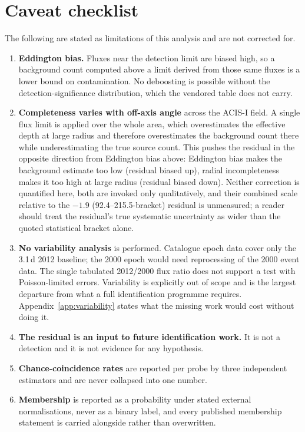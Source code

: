 \documentclass[11pt]{article}
\begin{document}
\appendix

\section{Caveat checklist}
\label{app:caveats}

The following are stated as limitations of this analysis and are not corrected for.

\begin{enumerate}
\item \textbf{Eddington bias.} Fluxes near the detection limit are biased high, so a background count computed above a limit derived from those same fluxes is a lower bound on contamination. No deboosting is possible without the detection-significance distribution, which the vendored table does not carry.
\item \textbf{Completeness varies with off-axis angle} across the ACIS-I field. A single flux limit is applied over the whole area, which overestimates the effective depth at large radius and therefore overestimates the background count there while underestimating the true source count. This pushes the residual in the opposite direction from Eddington bias above: Eddington bias makes the background estimate too low (residual biased up), radial incompleteness makes it too high at large radius (residual biased down). Neither correction is quantified here, both are invoked only qualitatively, and their combined scale relative to the $-1.9$ (92.4--215.5-bracket) residual is unmeasured; a reader should treat the residual's true systematic uncertainty as wider than the quoted statistical bracket alone.
\item \textbf{No variability analysis} is performed. Catalogue epoch data cover only the 3.1\,d 2012 baseline; the 2000 epoch would need reprocessing of the 2000 event data. The single tabulated 2012/2000 flux ratio does not support a test with Poisson-limited errors. Variability is explicitly out of scope and is the largest departure from what a full identification programme requires. Appendix~\ref{app:variability} states what the missing work would cost without doing it.
\item \textbf{The residual is an input to future identification work.} It is not a detection and it is not evidence for any hypothesis.
\item \textbf{Chance-coincidence rates} are reported per probe by three independent estimators and are never collapsed into one number.
\item \textbf{Membership} is reported as a probability under stated external normalisations, never as a binary label, and every published membership statement is carried alongside rather than overwritten.

\end{enumerate}
\end{document}
